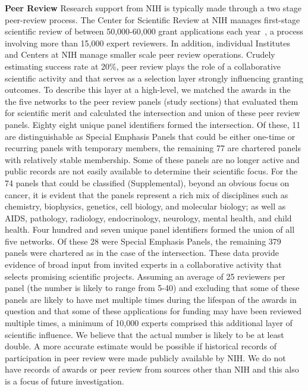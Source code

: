 \documentclass[10pt,letterpaper]{article}
\begin{document}
\textbf{Peer Review} Research support from NIH is typically made through a two stage peer-review process.  The Center for Scientific Review at NIH manages first-stage scientific review of between 50,000-60,000 grant applications each year~\cite{bibBoyack}, a process involving more than 15,000 expert reviewers. In addition, individual Institutes and Centers at NIH manage smaller scale peer review operations. Crudely estimating success rate at 20\%, peer review plays the role of a collaborative scientific activity and that serves as a selection layer strongly influencing granting outcomes. To describe this layer at a high-level, we matched the awards in the the five networks to the peer review panels (study sections) that evaluated them for scientific merit and calculated the intersection and union of these peer review panels. Eighty eight unique panel identifiers formed the intersection. Of these, 11 are distinguishable as Special Emphasis Panels that could be either one-time or recurring panels with temporary members, the remaining 77 are chartered panels with relatively stable membership. Some of these panels are no longer active and public records are not easily available to determine their scientific focus. For the 74 panels that could be classified (Supplemental), beyond an obvious focus on cancer, it is evident that the panels represent a rich mix of disciplines such as chemistry, biophysics, genetics, cell biology, and molecular biology; as well as AIDS, pathology, radiology, endocrinology, neurology, mental health, and child health. Four hundred and seven unique panel identifiers formed the union of all five networks. Of these 28 were Special Emphasis Panels, the remaining 379 panels were chartered as in the case of the intersection. These data provide evidence of broad input from invited experts in a collaborative activity that selects promising scientific projects. Assuming an average of 25 reviewers per panel (the number is likely to range from 5-40) and excluding that some of these panels are likely to have met multiple times during the lifespan of the awards in question and that some of these applications for funding may have been reviewed multiple times, a minimum of 10,000 experts comprised this additional layer of scientific influence. We believe that the actual number is likely to be at least double. A more accurate estimate would be possible if historical records of participation in peer review were made publicly available by NIH. We do not have records of awards or peer review from sources other than NIH and this also is a focus of future investigation.
\end{document}
